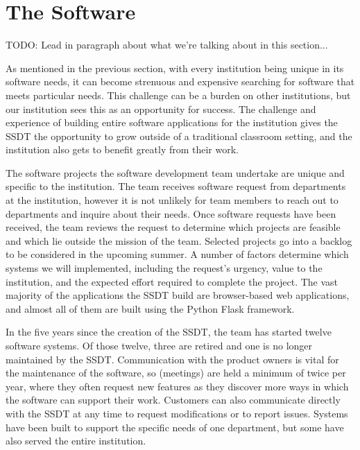 \section{The Software}

TODO: Lead in paragraph about what we're talking about in this section...

As mentioned in the previous section, with every institution being unique in its software needs, it can become strenuous and expensive searching for software that meets particular needs. This challenge can be a burden on other institutions, but our institution sees this as an opportunity for success. The challenge and experience of building entire software applications for the institution gives the SSDT the opportunity to grow outside of a traditional classroom setting, and the institution also gets to benefit greatly from their work.

The software projects the software development team undertake are unique and specific to the institution. The team receives software request from departments at the institution, however it is not unlikely for team members to reach out to departments and inquire about their needs. Once software requests have been received, the team reviews the request to determine which projects are feasible and which lie outside the mission of the team. Selected projects go into a backlog to be considered in the upcoming summer. A number of factors determine which systems we will implemented, including the request’s urgency, value to the institution, and the expected effort required to complete the project.
The vast majority of the applications the SSDT build are browser-based web applications, and almost all of them are built using the Python Flask framework.

In the five years since the creation of the SSDT, the team has started twelve software systems. Of those twelve, three are retired and one is no longer maintained by the SSDT. Communication with the product owners is vital for the maintenance of the software, so (meetings) are held a minimum of twice per year, where they often request new features as they discover more ways in which the software can support their work. Customers can also communicate directly with the SSDT at any time to request modifications or to report issues. Systems have been built to support the specific needs of one department, but some have also served the entire institution.


